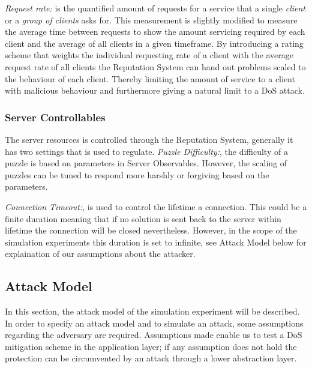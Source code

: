 \emph{Request rate:} is the quantified amount of requests for a service that a single \emph{client} or a \emph{group of clients} asks for. This measurement is slightly modified to measure the average time between requests to show the amount servicing required by each client and the average of all clients in a given timeframe. By introducing a rating scheme that weights the individual requesting rate of a client with the average request rate of all clients the Reputation System can hand out problems scaled to the behaviour of each client. Thereby limiting the amount of service to a client with malicious behaviour and furthermore giving a natural limit to a DoS attack.


\subsubsection{Server Controllables}
The server resources is controlled through the Reputation System, generally it has two settings that is used to regulate.
\emph{Puzzle Difficulty:}, the difficulty of a puzzle is based on parameters in Server Observables. However, the scaling of puzzles can be tuned to respond more harshly or forgiving based on the parameters.

\emph{Connection Timeout:}, is used to control the lifetime a connection. This could be a finite duration meaning that if no solution is sent back to the server within lifetime the connection will be closed nevertheless.
However, in the scope of the simulation experiments this duration is set to infinite, see Attack Model below for explaination of our assumptions about the attacker. 
\subsection{Attack Model}
In this section, the attack model of the simulation experiment will be described.
In order to specify an attack model and to simulate an attack, some assumptions regarding the adversary are required.
Assumptions made enable us to test a DoS mitigation scheme in the application layer; if any assumption does not hold the protection can be circumvented by an attack through a lower abstraction layer. 

